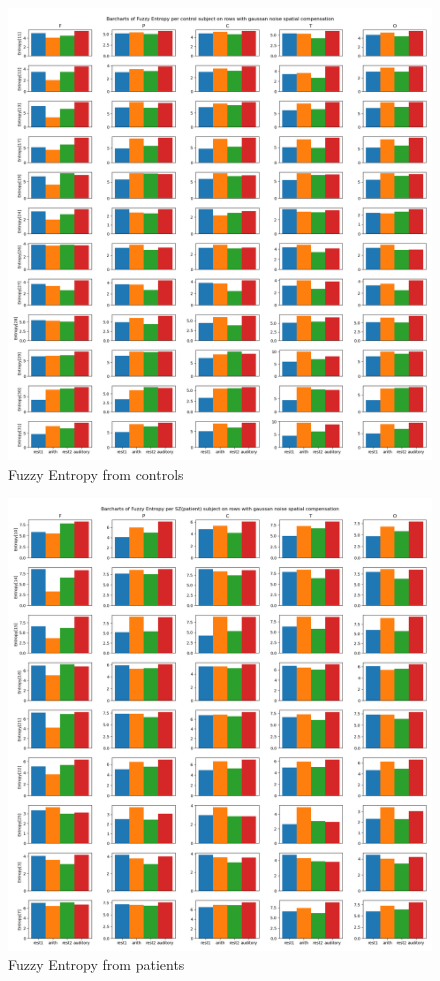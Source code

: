 \documentclass[10pt]{article}
\begin{document}
\begin{figure}[H]
  \includegraphics[width=16cm]{../../../data_analysis_results/FuzzEnt/Control/all-fuzzyEntr.png}
  \caption{Fuzzy Entropy from controls}\label{fig:controlFuzzEnt}
\end{figure}
\begin{figure}[H]
  \includegraphics[width=16cm]{../../../data_analysis_results/FuzzEnt/Patient/all-fuzzyEntr.png}
  \caption{Fuzzy Entropy from patients}\label{fig:patientFuzzEnt}
\end{figure}
\end{document}
